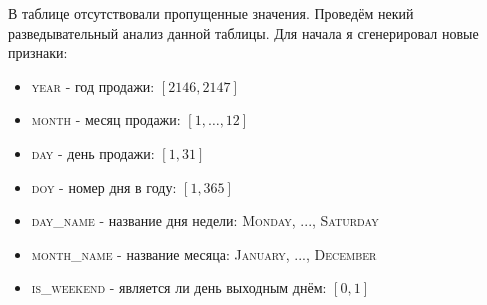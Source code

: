 \documentclass[%
10pt, %
final, %
oneside, %
onecolumn, %
centertags]{article} %
\theoremstyle{plain}
\theoremstyle{definition}
\theoremstyle{remark}
\begin{document}
В таблице отсутствовали пропущенные значения. Проведём некий разведывательный анализ данной таблицы. Для начала я сгенерировал новые признаки:
\begin{itemize}
	\item \textsc{year} - год продажи: $[2146, 2147]$
	\item \textsc{month} - месяц продажи: $[1, \ldots, 12]$
	\item \textsc{day} - день продажи: $[1, 31]$
	\item \textsc{doy} - номер дня в году: $[1, 365]$
	\item \textsc{day\_name} - название дня недели: \textsc{Monday, ..., Saturday}
	\item \textsc{month\_name} - название месяца: \textsc{January, ..., December}
	\item \textsc{is\_weekend} - является ли день выходным днём: $[0, 1]$
\end{itemize}
\end{document}
